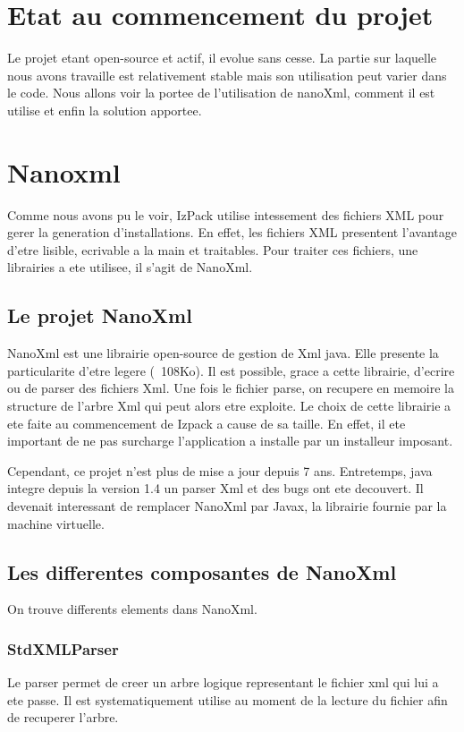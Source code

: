 \section{Etat au commencement du projet}
Le projet etant open-source et actif, il evolue sans cesse. La partie sur laquelle nous avons travaille est relativement stable mais son utilisation peut varier dans le code. Nous allons voir la portee de l'utilisation de nanoXml, comment il est utilise et enfin la solution apportee.

\section{Nanoxml}
Comme nous avons pu le voir, IzPack utilise intessement des fichiers XML pour gerer la generation d'installations. En effet, les fichiers XML presentent l'avantage d'etre lisible, ecrivable a la main et traitables. Pour traiter ces fichiers, une librairies a ete utilisee, il s'agit de NanoXml.

\subsection{Le projet NanoXml}
NanoXml est une librairie open-source de gestion de Xml java. Elle presente la particularite d'etre legere (~108Ko). Il est possible, grace a cette librairie, d'ecrire ou de parser des fichiers Xml. Une fois le fichier parse, on recupere en memoire la structure de l'arbre Xml qui peut alors etre exploite. Le choix de cette librairie a ete faite au commencement de Izpack a cause de sa taille. En effet, il ete important de ne pas surcharge l'application a installe par un installeur imposant. 

Cependant, ce projet n'est plus de mise a jour depuis 7 ans. Entretemps, java integre depuis la version 1.4 un parser Xml et des bugs ont ete decouvert. Il devenait interessant de remplacer NanoXml par Javax, la librairie fournie par la machine virtuelle.
\subsection{Les differentes composantes de NanoXml}
On trouve differents elements dans NanoXml.
\subsubsection{StdXMLParser}
Le parser permet de creer un arbre logique representant le fichier xml qui lui a ete passe. Il est systematiquement utilise au moment de la lecture du fichier afin de recuperer l'arbre.
